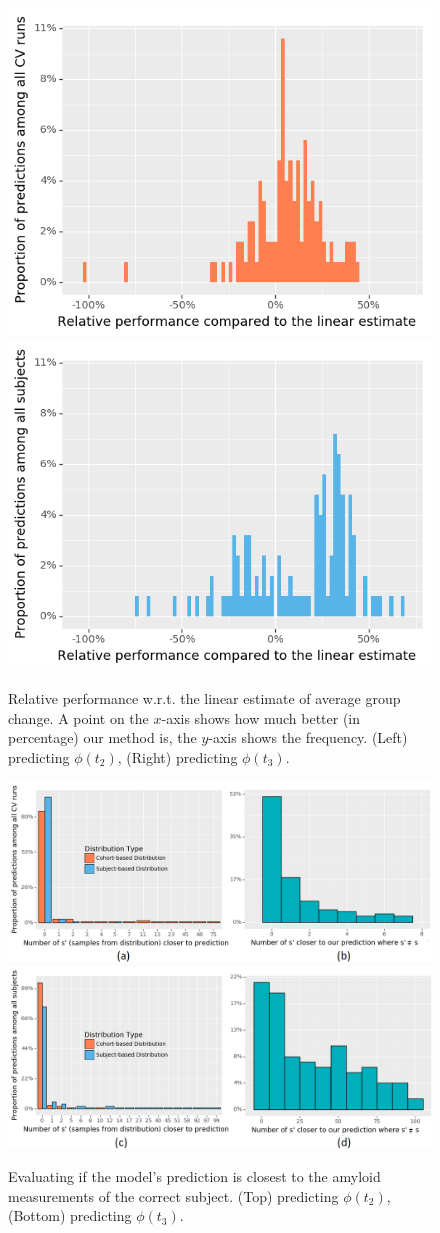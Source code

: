 \documentclass{article}
\begin{document}
\begin{figure}[!t]
\setlength{\belowcaptionskip}{-0.1cm}
\centering
\includegraphics[width=0.495\columnwidth]{4a.png}
\includegraphics[width=0.495\columnwidth]{4b.png}
\caption{Relative performance w.r.t. the linear estimate of average group change.
  A point on the $x$-axis shows how much better (in percentage) our method is, the $y$-axis shows the frequency.
(Left) predicting $\phi(t_2)$, (Right) predicting $\phi(t_3)$.}%
    \label{fig:BETTER/WORSE}
\end{figure}

\begin{figure}[!t]
\setlength{\belowcaptionskip}{-0.1cm}
\centering
\includegraphics[width=1\columnwidth]{3a_b.png}
\includegraphics[width=1\columnwidth]{3c_d.png}
\caption{Evaluating if the model's prediction is closest to the amyloid measurements of the correct subject. (Top) predicting $\phi(t_2)$, (Bottom) predicting $\phi(t_3)$.}%
    \label{fig:eval_fig}
\end{figure}
\end{document}
